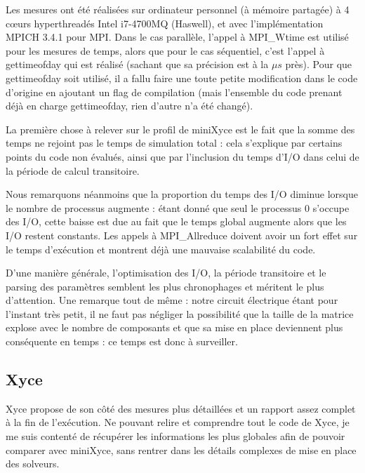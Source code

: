\documentclass[11pt,a4paper,oneside]{memoir}
\theoremstyle{definition}
\theoremstyle{remark}
\theoremstyle{plain}
\begin{document}
Les mesures ont été réalisées sur ordinateur personnel (à mémoire partagée) à 4 cœurs hyperthreadés Intel i7-4700MQ (Haswell), et avec l'implémentation MPICH 3.4.1 pour MPI. Dans le cas parallèle, l'appel à MPI\_Wtime est utilisé pour les mesures de temps, alors que pour le cas séquentiel, c'est l'appel à gettimeofday qui est réalisé (sachant que sa précision est à la $\mu s$ près). Pour que gettimeofday soit utilisé, il a fallu faire une toute petite modification dans le code d'origine en ajoutant un flag de compilation (mais l'ensemble du code prenant déjà en charge gettimeofday, rien d'autre n'a été changé).\bigskip

La première chose à relever sur le profil de miniXyce est le fait que la somme des temps ne rejoint pas le temps de simulation total : cela s'explique par certains points du code non évalués, ainsi que par l'inclusion du temps d'I/O dans celui de la période de calcul transitoire.

Nous remarquons néanmoins que la proportion du temps des I/O diminue lorsque le nombre de processus augmente : étant donné que seul le processus 0 s'occupe des I/O, cette baisse est due au fait que le temps global augmente alors que les I/O restent constants. Les appels à MPI\_Allreduce doivent avoir un fort effet sur le temps d'exécution et montrent déjà une mauvaise scalabilité du code.

D'une manière générale, l'optimisation des I/O, la période transitoire et le parsing des paramètres semblent les plus chronophages et méritent le plus d'attention. Une remarque tout de même : notre circuit électrique étant pour l'instant très petit, il ne faut pas négliger la possibilité que la taille de la matrice explose avec le nombre de composants et que sa mise en place deviennent plus conséquente en temps : ce temps est donc à surveiller.




\subsection{Xyce}

Xyce propose de son côté des mesures plus détaillées et un rapport assez complet à la fin de l'exécution. Ne pouvant relire et comprendre tout le code de Xyce, je me suis contenté de récupérer les informations les plus globales afin de pouvoir comparer avec miniXyce, sans rentrer dans les détails complexes de mise en place des solveurs.
\end{document}

